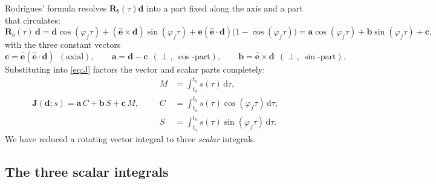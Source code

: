 \documentclass[11pt]{article}
\newcommand{\dd}{\,\mathrm{d}}
\newcommand{\Rb}{\mathbf{R}_b}
\newcommand{\nf}{\hat{\mathbf{e}}}            %
\begin{document}
Rodrigues' formula resolves $\Rb(\tau)\mathbf{d}$ into a part fixed along the axis and a
part that circulates:
\begin{equation}
  \Rb(\tau)\,\mathbf{d}
  = \mathbf{d}\cos(\varphi_f\tau)
  + (\nf\times\mathbf{d})\sin(\varphi_f\tau)
  + \nf(\nf\!\cdot\!\mathbf{d})\big(1-\cos(\varphi_f\tau)\big)
  = \mathbf{a}\cos(\varphi_f\tau)+\mathbf{b}\sin(\varphi_f\tau)+\mathbf{c},
\end{equation}
with the three constant vectors
\begin{equation}
  \mathbf{c}=\nf(\nf\!\cdot\!\mathbf{d}) \ \ (\text{axial}),\qquad
  \mathbf{a}=\mathbf{d}-\mathbf{c}\ \ (\perp,\ \cos\text{-part}),\qquad
  \mathbf{b}=\nf\times\mathbf{d}\ \ (\perp,\ \sin\text{-part}).
\end{equation}
Substituting into \eqref{eq:J} factors the vector and scalar parts completely:
\begin{equation}
  \mathbf{J}(\mathbf{d};s) = \mathbf{a}\,C + \mathbf{b}\,S + \mathbf{c}\,M,
  \qquad
  \begin{aligned}
    M &= \int_{t_a}^{t_b}\! s(\tau)\dd\tau,\\
    C &= \int_{t_a}^{t_b}\! s(\tau)\cos(\varphi_f\tau)\dd\tau,\\
    S &= \int_{t_a}^{t_b}\! s(\tau)\sin(\varphi_f\tau)\dd\tau.
  \end{aligned}
  \label{eq:JaCbScM}
\end{equation}
We have reduced a rotating vector integral to three \emph{scalar} integrals.

\subsection{The three scalar integrals}
\end{document}
